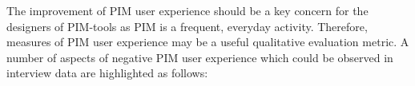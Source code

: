 
The improvement of PIM user experience should be a key concern for the designers of PIM-tools as PIM is a frequent, everyday activity. Therefore, measures of PIM user experience may be a useful qualitative evaluation metric.  A number of aspects of negative PIM user experience which could be observed in interview data are highlighted as follows:

